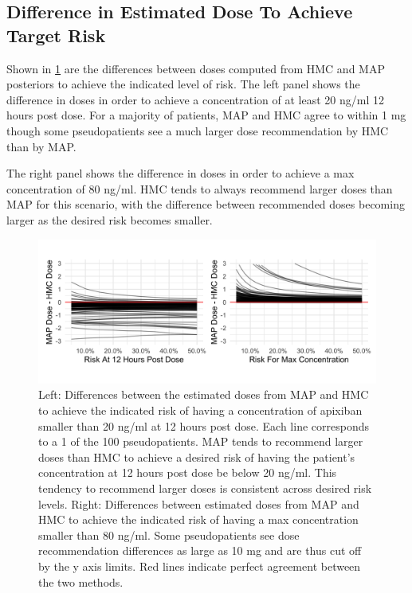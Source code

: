 \subsection*{Difference in Estimated Dose To Achieve Target Risk}


Shown in \cref{fig:fig7} are the differences between doses computed from HMC and MAP posteriors to achieve the indicated level of risk.  The left panel shows the difference in doses in order to achieve a concentration of at least 20 ng/ml 12 hours post dose. For a majority of patients, MAP and HMC agree to within 1 mg though some pseudopatients see a much larger dose recommendation by HMC than by MAP.  

The right panel shows the difference in doses in order to achieve a max concentration of 80 ng/ml.  HMC tends to always recommend larger doses than MAP for this scenario, with the difference between recommended doses becoming larger as the desired risk becomes smaller.

\begin{figure}[h!]
	\centering
	\includegraphics[width=\linewidth]{figs/experiments}
	\caption{Left: Differences between the estimated doses from MAP and HMC to achieve the indicated risk of having a concentration of apixiban smaller than 20 ng/ml at 12 hours post dose. Each line corresponds to a 1 of the 100 pseudopatients. MAP tends to recommend larger doses than HMC to achieve a desired risk of having the patient's concentration at 12 hours post dose be below 20 ng/ml. This tendency to recommend larger doses is consistent across desired risk levels.  Right: Differences between estimated doses from MAP and HMC to achieve the indicated risk of having a max concentration smaller than 80 ng/ml.  Some pseudopatients see dose recommendation differences as large as 10 mg and are thus cut off by the y axis limits. Red lines indicate perfect agreement between the two methods.}
	\label{fig:fig7}
\end{figure}


